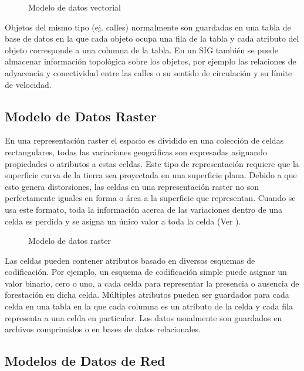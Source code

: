 \begin{figure}[h]
	\centering
	
	\caption{Modelo de datos vectorial}
	\label{fig:modelo-vectorial} 
\end{figure}

Objetos del mismo tipo (ej. calles) normalmente son guardadas en una tabla de base de datos en la que cada objeto ocupa una fila de la tabla y cada atributo del objeto corresponde a una columna de la tabla. En un SIG también se puede almacenar información topológica sobre los objetos, por ejemplo las relaciones de adyacencia y conectividad entre las calles o su sentido de circulación y su límite de velocidad.

\subsection{Modelo de Datos Raster}

En una representación raster el espacio es dividido en una colección de celdas rectangulares, todas las variaciones geográficas son expresadas asignando propiedades o atributos a estas celdas. Este tipo de representación requiere que la superficie curva de la tierra sea proyectada en una superficie plana. Debido a que esto genera distorsiones, las celdas en una representación raster no son perfectamente iguales en forma o área a la superficie que representan. Cuando se usa este formato, toda la información acerca de las variaciones dentro de una celda es perdida y se asigna un único valor a toda la celda (Ver ).

\begin{figure}[h]
	\centering
	
	\caption{Modelo de datos raster}
	\label{fig:modelo-raster} 
\end{figure}

Las celdas pueden contener atributos basado en diversos esquemas de codificación. Por ejemplo, un esquema de codificación simple puede asignar un valor binario, cero o uno, a cada celda para representar la presencia o ausencia de forestación en dicha celda. Múltiples atributos pueden ser guardados para cada celda en una tabla en la que cada columna es un atributo de la celda y cada fila representa a una celda en particular. Los datos usualmente son guardados en archivos comprimidos o en bases de datos relacionales.

\subsection{Modelos de Datos de Red}

